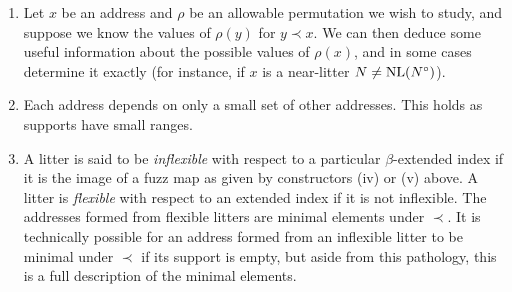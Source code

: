 \begin{remarks}\mbox{\negthinspace}
    \begin{enumerate}
        \item Let \( x \) be an address and \( \rho \) be an allowable permutation we wish to study, and suppose we know the values of \( \rho(y) \) for \( y \prec x \).
        We can then deduce some useful information about the possible values of \( \rho(x) \), and in some cases determine it exactly (for instance, if \( x \) is a near-litter \( N \neq \operatorname{NL}(N^\circ) \)).
        \item Each address depends on only a small set of other addresses.
        This holds as supports have small ranges.
        \item A litter is said to be \emph{inflexible} with respect to a particular \( \beta \)-extended index if it is the image of a fuzz map as given by constructors (iv) or (v) above.
        A litter is \emph{flexible} with respect to an extended index if it is not inflexible.
        The addresses formed from flexible litters are minimal elements under \( \prec \).
        It is technically possible for an address formed from an inflexible litter to be minimal under \( \prec \) if its support is empty, but aside from this pathology, this is a full description of the minimal elements.
    \end{enumerate}
\end{remarks}

